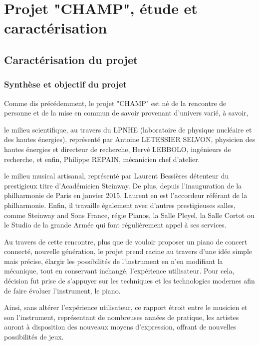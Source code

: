 \documentclass[french,a4paper,12pt]{report}
\begin{document}
%
%
\part{Projet "CHAMP", étude et caractérisation}

	\chapter{Caractérisation du projet}
	
	\section{Synthèse et objectif du projet}
	
	Comme dis précédemment, le projet "CHAMP" est né de la rencontre de personne et de la mise en commun de savoir provenant d'univers varié, à savoir, 
	
	le milieu scientifique, au travers du LPNHE (laboratoire de physique nucléaire et des hautes énergies), représenté par Antoine LETESSIER SELVON, physicien des hautes énergies et directeur de recherche, Hervé LEBBOLO, ingénieurs de recherche, et enfin,  Philippe REPAIN, mécanicien chef d'atelier.
	
	le milieu musical artisanal, représenté par Laurent Bessières détenteur du prestigieux titre d'Académicien Steinway.
	De plus, depuis l'inauguration de la philharmonie de Paris en janvier 2015, Laurent en est l'accordeur référant de la philharmonie. Enfin, il travaille également avec d'autres prestigieuses salles, comme Steinway and Sons France, régie Pianos, la Salle Pleyel, la Salle Cortot ou le Studio de la grande Armée qui font régulièrement appel à ses services.	
	
	Au travers de cette rencontre, plus que de vouloir proposer un piano de concert connecté, nouvelle génération, le projet prend racine au travers d'une idée simple mais précise, élargir les possibilités de l'instrument en n'en modifiant la mécanique, tout en conservant inchangé, l'expérience utilisateur.
	Pour cela, décision fut prise de s'appuyer sur les techniques et les technologies modernes afin de faire évoluer l'instrument, le piano.
	
	Ainsi, sans altérer l'expérience utilisateur, ce rapport étroit entre le musicien et son l'instrument, représentant de nombreuses années de pratique, les artistes auront à disposition des nouveaux moyens d'expression, offrant de nouvelles possibilités de jeux.
	
\end{document}

